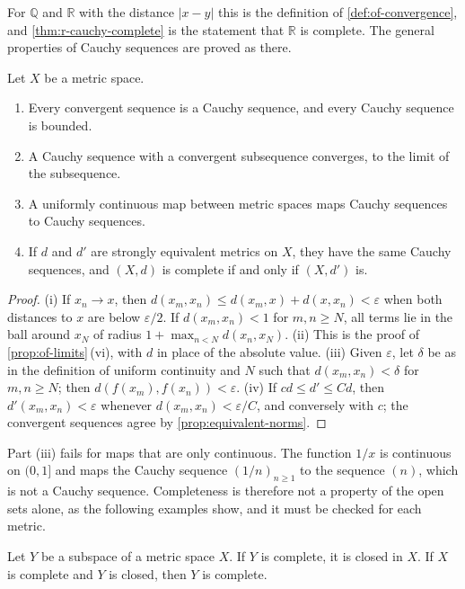 For $\mathbb Q$ and $\mathbb R$ with the distance $|x-y|$ this is the definition of \cref{def:of-convergence}, and \cref{thm:r-cauchy-complete} is the statement that $\mathbb R$ is complete. The general properties of Cauchy sequences are proved as there.

\begin{proposition}
\label{prop:cauchy-basic}
Let $X$ be a metric space.
\begin{enumerate}
\item Every convergent sequence is a Cauchy sequence, and every Cauchy sequence is bounded.
\item A Cauchy sequence with a convergent subsequence converges, to the limit of the subsequence.
\item A uniformly continuous map between metric spaces maps Cauchy sequences to Cauchy sequences.
\item If $d$ and $d'$ are strongly equivalent metrics on $X$, they have the same Cauchy sequences, and $(X,d)$ is complete if and only if $(X,d')$ is.
\end{enumerate}
\end{proposition}

\begin{proof}
(i) If $x_n\to x$, then $d(x_m,x_n)\le d(x_m,x)+d(x,x_n)<\varepsilon$ when both distances to $x$ are below $\varepsilon/2$. If $d(x_m,x_n)<1$ for $m,n\ge N$, all terms lie in the ball around $x_N$ of radius $1+\max_{n<N}d(x_n,x_N)$. (ii) This is the proof of \cref{prop:of-limits}\,(vi), with $d$ in place of the absolute value. (iii) Given $\varepsilon$, let $\delta$ be as in the definition of uniform continuity and $N$ such that $d(x_m,x_n)<\delta$ for $m,n\ge N$; then $d(f(x_m),f(x_n))<\varepsilon$. (iv) If $cd\le d'\le Cd$, then $d'(x_m,x_n)<\varepsilon$ whenever $d(x_m,x_n)<\varepsilon/C$, and conversely with $c$; the convergent sequences agree by \cref{prop:equivalent-norms}.
\end{proof}

Part (iii) fails for maps that are only continuous. The function $1/x$ is continuous on $(0,1]$ and maps the Cauchy sequence $(1/n)_{n\ge1}$ to the sequence $(n)$, which is not a Cauchy sequence. Completeness is therefore not a property of the open sets alone, as the following examples show, and it must be checked for each metric.

\begin{proposition}
\label{prop:closed-complete}
Let $Y$ be a subspace of a metric space $X$. If $Y$ is complete, it is closed in $X$. If $X$ is complete and $Y$ is closed, then $Y$ is complete.
\end{proposition}

